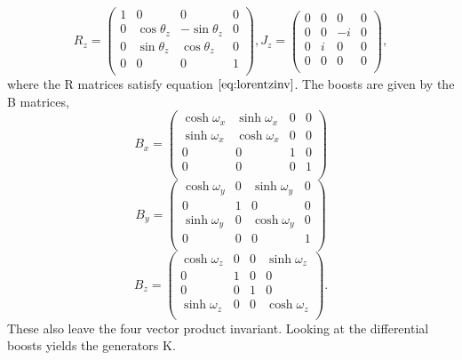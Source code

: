 \begin{equation}
R_z = 
\begin{pmatrix}
1 & 0 & 0 & 0\\
0 & \cos\theta_z & -\sin\theta_z & 0 \\
0 & \sin\theta_z & \cos\theta_z & 0 \\
0 & 0 & 0 & 1 \\
\end{pmatrix},
J_z = 
\begin{pmatrix}
0 & 0 & 0 & 0\\
0 & 0 & -i & 0 \\
0 & i & 0 & 0 \\
0 & 0 & 0 & 0 \\
\end{pmatrix},
\end{equation}
where the R matrices satisfy equation $\ref{eq:lorentzinv}$. The boosts are given by the B matrices, 
\begin{equation}
B_x = 
\begin{pmatrix}
\cosh\omega_x & \sinh\omega_x & 0 & 0 \\
\sinh\omega_x & \cosh\omega_x & 0 & 0 \\
0 & 0 & 1 & 0 \\
0 & 0 & 0 & 1 \\
\end{pmatrix}
\end{equation}
\begin{equation}
B_y = 
\begin{pmatrix}
\cosh\omega_y & 0 & \sinh\omega_y & 0 \\
0 & 1 & 0 & 0 \\
\sinh\omega_y & 0 & \cosh\omega_y & 0 \\
0 & 0 & 0 & 1 \\
\end{pmatrix}
\end{equation}
\begin{equation}
B_z = 
\begin{pmatrix}
\cosh\omega_z & 0 & 0 & \sinh\omega_z \\
0 & 1 & 0 & 0 \\
0 & 0 & 1 & 0 \\
\sinh\omega_z & 0 & 0 & \cosh\omega_z \\
\end{pmatrix}.
\end{equation}
These also leave the four vector product invariant. Looking at the differential boosts yields the generators K.
